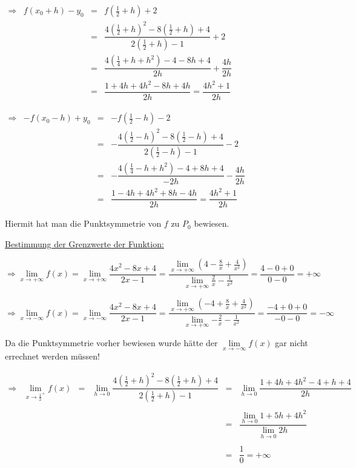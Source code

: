 \documentclass[main.tex]{subfiles}
\begin{document}
$\begin{array}{rccl}
	\Rightarrow & f(x_{0}+h)-y_{0} & = & f(\frac{1}{2} + h) +2 \\
	&&=&\dfrac{4(\frac{1}{2}+h)^2 -8(\frac{1}{2}+h) +4}{2(\frac{1}{2}+h)-1}+2 \\
	&&=&\dfrac{4(\frac{1}{4} +h +h^2)-4 -8h +4}{2h} + \dfrac{4h}{2h} \\
	&&=&\dfrac{1+4h+4h^2-8h+4h}{2h} = \dfrac{4h^2+1}{2h}
\end{array}$

$\begin{array}{rccl}
	\Rightarrow & -f(x_{0}-h)+y_{0} & = & -f(\frac{1}{2} - h) -2 \\
	&&=&-\dfrac{4(\frac{1}{2}-h)^2 -8(\frac{1}{2}-h) +4}{2(\frac{1}{2}-h)-1}-2\\
	&&=&-\dfrac{4(\frac{1}{4} -h +h^2)-4 +8h +4}{-2h} - \dfrac{4h}{2h}    \\
	&&=&\dfrac{1-4h+4h^2+8h-4h}{2h} = \dfrac{4h^2+1}{2h}
\end{array}$

Hiermit hat man die Punktsymmetrie von $f$ zu $P_{0}$ bewiesen.

\underline{Bestimmung der Grenzwerte der Funktion:}

$\Rightarrow \lim\limits_{x \rightarrow +\infty} {f(x)} = \lim\limits_{x \rightarrow +\infty} {\dfrac{4x^2-8x+4}{2x-1}} = \dfrac{\lim\limits_{x \rightarrow +\infty} {(4-\frac{8}{x} + \frac{4}{x^2}) }}{{\lim\limits_{x \rightarrow +\infty}}{ \frac{2}{x} - \frac{1}{x^2} }} = \dfrac{4-0+0}{0-0} = +\infty $

$\Rightarrow \lim\limits_{x \rightarrow -\infty} {f(x)} = \lim\limits_{x \rightarrow -\infty} {\dfrac{4x^2-8x+4}{2x-1}} = \dfrac{\lim\limits_{x \rightarrow +\infty} {(-4+\frac{8}{x} + \frac{4}{x^2}) }}{{\lim\limits_{x \rightarrow +\infty}}{ -\frac{2}{x} - \frac{1}{x^2} }} = \dfrac{-4+0+0}{-0-0} = -\infty $

\begin{Bemerkung}
Da die Punktsymmetrie vorher bewiesen wurde hätte der $\lim\limits_{x \rightarrow -\infty} {f(x)}$ gar nicht errechnet werden müssen!
\end{Bemerkung}

$\begin{array}{rccccl}
	\Rightarrow &  \lim\limits_{x \rightarrow {\frac{1}{2}}^{+}} {f(x)} & = & \lim\limits_{h \rightarrow 0} {\dfrac{4(\frac{1}{2} +h)^2 -8(\frac{1}{2} +h) +4}{2(\frac{1}{2}+h) -1} } & = & \lim\limits_{h \rightarrow 0} {\dfrac{1+4h+4h^2-4+h+4 }{2h}}\\ \\
	&&&&=&\dfrac{\lim\limits_{h \rightarrow 0} {1+5h+4h^2}}{\lim\limits_{h \rightarrow 0}{2h}} \\ \\
	&&&&=& \dfrac{1}{0} = +\infty \\ \\
\end{array}$
\end{document}
